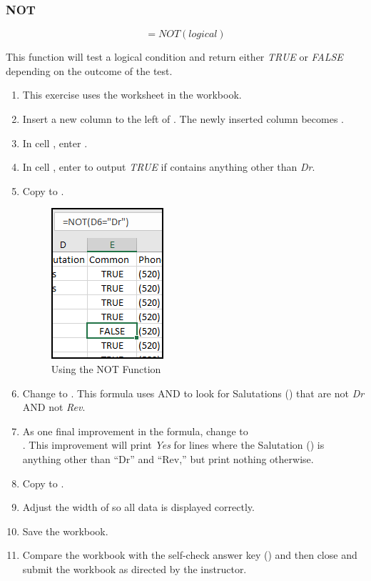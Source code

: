 \subsubsection{NOT}

\[ =NOT(logical) \]

This function will test a logical condition and return either \textit{TRUE} or \textit{FALSE} depending on the outcome of the test.

\begin{enumbox}
	\begin{enumerate}
		\item This exercise uses the  worksheet in the  workbook.
		\item Insert a new column to the left of . The newly inserted column becomes .
		\item In cell , enter .
		\item In cell , enter  to output \textit{TRUE} if  contains anything other than \textit{Dr}. 
		\item Copy  to .
		
		\begin{figure}[H]
			\centering
			\includegraphics[width=\maxwidth{.40\linewidth}]{gfx/ch09_fig48}
			\caption{Using the NOT Function}
			\label{09:fig48}
		\end{figure}
		
		\item Change  to . This formula uses AND to look for Salutations () that are not \textit{Dr} AND not \textit{Rev}.
		\item As one final improvement in the formula, change  to  \\. This improvement will print \textit{Yes} for lines where the Salutation () is anything other than ``Dr'' and ``Rev,'' but print nothing otherwise.	
		\item Copy  to .
		\item Adjust the width of  so all data is displayed correctly.
		\item Save the  workbook.
		\item Compare the workbook with the self-check answer key () and then close and submit the  workbook as directed by the instructor.
	

\end{enumerate}
\end{enumbox}
